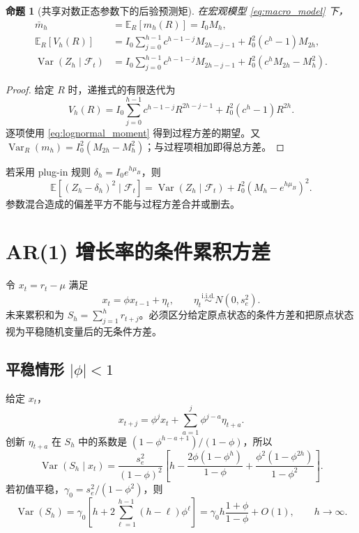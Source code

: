 \documentclass[11pt,a4paper]{article}
\newtheorem{proposition}[theorem]{命题}
\theoremstyle{remark}
\newcommand{\E}{\mathbb{E}}
\newcommand{\Var}{\operatorname{Var}}
\begin{document}
\begin{proposition}[共享对数正态参数下的后验预测矩]
在宏观模型 \eqref{eq:macro_model} 下，
\begin{align}
\bar m_h&=\E_R[m_h(R)]=I_0M_h,\label{eq:ln_mean}\\
\E_R[V_h(R)]
&=I_0\sum_{j=0}^{h-1}c^{h-1-j}M_{2h-j-1}
+I_0^2(c^h-1)M_{2h},\label{eq:ln_process}\\
\Var(Z_h\mid\mathcal F_t)
&=I_0\sum_{j=0}^{h-1}c^{h-1-j}M_{2h-j-1}
+I_0^2\left(c^hM_{2h}-M_h^2\right).\label{eq:ln_total}
\end{align}
\end{proposition}
\begin{proof}
给定 $R$ 时，递推式的有限迭代为
\begin{equation}
V_h(R)=I_0\sum_{j=0}^{h-1}c^{h-1-j}R^{2h-j-1}
+I_0^2(c^h-1)R^{2h}.
\end{equation}
逐项使用 \eqref{eq:lognormal_moment} 得到过程方差的期望。又
$\Var_R(m_h)=I_0^2(M_{2h}-M_h^2)$；与过程项相加即得总方差。
\end{proof}
若采用 plug-in 规则 $\delta_h=I_0e^{h\mu_B}$，则
\begin{equation}
\E[(Z_h-\delta_h)^2\mid\mathcal F_t]
=\Var(Z_h\mid\mathcal F_t)+I_0^2(M_h-e^{h\mu_B})^2.
\end{equation}
参数混合造成的偏差平方不能与过程方差合并或删去。

\section{AR(1) 增长率的条件累积方差}
令 $x_t=r_t-\mu$ 满足
\begin{equation}
x_t=\phi x_{t-1}+\eta_t,\qquad
\eta_t\stackrel{\mathrm{i.i.d.}}{\sim}N(0,s_e^2).\label{eq:ar1}
\end{equation}
未来累积和为 $S_h=\sum_{j=1}^hr_{t+j}$。必须区分给定原点状态的条件方差和把原点状态视为平稳随机变量后的无条件方差。

\subsection{平稳情形 \texorpdfstring{$|\phi|<1$}{abs(phi)<1}}
给定 $x_t$，
\begin{equation}
x_{t+j}=\phi^jx_t+\sum_{a=1}^j\phi^{j-a}\eta_{t+a}.
\end{equation}
创新 $\eta_{t+a}$ 在 $S_h$ 中的系数是 $(1-\phi^{h-a+1})/(1-\phi)$，所以
\begin{equation}
\Var(S_h\mid x_t)=\frac{s_e^2}{(1-\phi)^2}
\left[h-\frac{2\phi(1-\phi^h)}{1-\phi}
+\frac{\phi^2(1-\phi^{2h})}{1-\phi^2}\right].\label{eq:ar_cond}
\end{equation}
若初值平稳，$\gamma_0=s_e^2/(1-\phi^2)$，则
\begin{equation}
\Var(S_h)=\gamma_0\left[h+2\sum_{\ell=1}^{h-1}(h-\ell)\phi^\ell\right]
=\gamma_0h\frac{1+\phi}{1-\phi}+O(1),\qquad h\to\infty.\label{eq:ar_stationary}
\end{equation}
\end{document}
